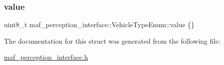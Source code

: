 \subsubsection{\texorpdfstring{value}{value}}
{\footnotesize\ttfamily uint8\+\_\+t maf\+\_\+perception\+\_\+interface\+::\+Vehicle\+Type\+Enum\+::value \{\}}



The documentation for this struct was generated from the following file\+:\begin{DoxyCompactItemize}
\item 
\hyperlink{maf__perception__interface_8h}{maf\+\_\+perception\+\_\+interface.\+h}\end{DoxyCompactItemize}
